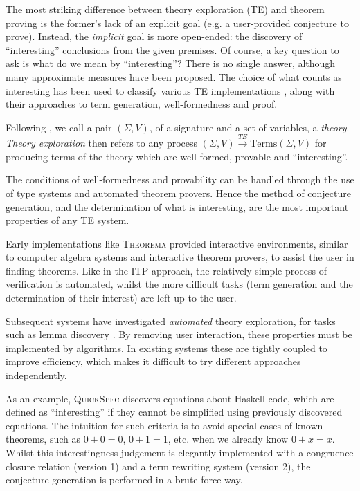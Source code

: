 \documentclass[]{article}
\begin{document}
The most striking difference between theory exploration (TE) and theorem proving is the former's lack of an explicit goal (e.g. a user-provided conjecture to prove). Instead, the \emph{implicit} goal is more open-ended: the discovery of ``interesting'' conclusions from the given premises. Of course, a key question to ask is what do we mean by ``interesting''? There is no single answer, although many approximate measures have been proposed. The choice of what counts as interesting has been used to classify various TE implementations \cite{warburtonscaling}, along with their approaches to term generation, well-formedness and proof.

Following \cite{warburtonscaling}, we call a pair $(\Sigma, V)$, of a signature and a set of variables, a \emph{theory}. \emph{Theory exploration} then refers to any process $(\Sigma, V) \overset{TE}{\rightarrow} \text{Terms}(\Sigma, V)$ for producing terms of the theory which are well-formed, provable and ``interesting''.

The conditions of well-formedness and provability can be handled through the use of type systems and automated theorem provers. Hence the method of conjecture generation, and the determination of what is interesting, are the most important properties of any TE system.

Early implementations like \textsc{Theorema} \cite{buchberger2000theory} provided interactive environments, similar to computer algebra systems and interactive theorem provers, to assist the user in finding theorems. Like in the ITP approach, the relatively simple process of verification is automated, whilst the more difficult tasks (term generation and the determination of their interest) are left up to the user.

Subsequent systems have investigated \emph{automated} theory exploration, for tasks such as lemma discovery \cite{Hipster}. By removing user interaction, these properties must be implemented by algorithms. In existing systems these are tightly coupled to improve efficiency, which makes it difficult to try different approaches independently.

As an example, \textsc{QuickSpec} \cite{QuickSpec} discovers equations about Haskell code, which are defined as ``interesting'' if they cannot be simplified using previously discovered equations. The intuition for such criteria is to avoid special cases of known theorems, such as $0 + 0 = 0$, $0 + 1 = 1$, etc. when we already know $0 + x = x$. Whilst this interestingness judgement is elegantly implemented with a congruence closure relation (version 1) and a term rewriting system
(version 2), the conjecture generation is performed in a brute-force way.
\end{document}

